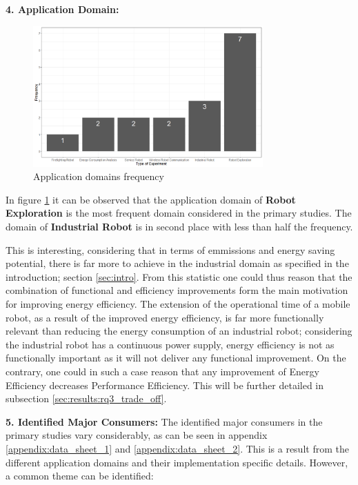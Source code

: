 \vspace{2mm}

\noindent\textbf{4. Application Domain:}
\begin{figure}[t]
    \includegraphics[width=250pt]{figures/domain_freq_barplot.png}
    \caption{Application domains frequency}
    \label{fig:app_domains}
\end{figure}
In figure \ref{fig:app_domains} it can be observed that the application domain of \textbf{Robot Exploration} is the most frequent
domain considered in the primary studies. 
The domain of \textbf{Industrial Robot} is in second place with less than half the frequency.

This is interesting, considering that in terms of emmissions and energy saving potential, there is far more to achieve in the industrial domain
as specified in the introduction; section \ref{sec:intro}.
From this statistic one could thus reason that the combination of functional and efficiency improvements form the main motivation for improving energy efficiency. 
The extension of the operational time of a mobile robot, as a result of the improved energy efficiency, 
is far more functionally relevant than reducing the energy consumption of an industrial robot;
considering the industrial robot has a continuous power supply, energy efficiency is not as functionally important as it will
not deliver any functional improvement.
On the contrary, one could in such a case reason that any improvement of Energy Efficiency decreases Performance Efficiency.
This will be further detailed in subsection \ref{sec:results:rq3_trade_off}.

\vspace{2mm}

\noindent\textbf{5. Identified Major Consumers:}
The identified major consumers in the primary studies vary considerably, as can be seen in appendix \ref{appendix:data_sheet_1} and \ref{appendix:data_sheet_2}.
This is a result from the different application domains and their implementation specific details.
However, a common theme can be identified:

